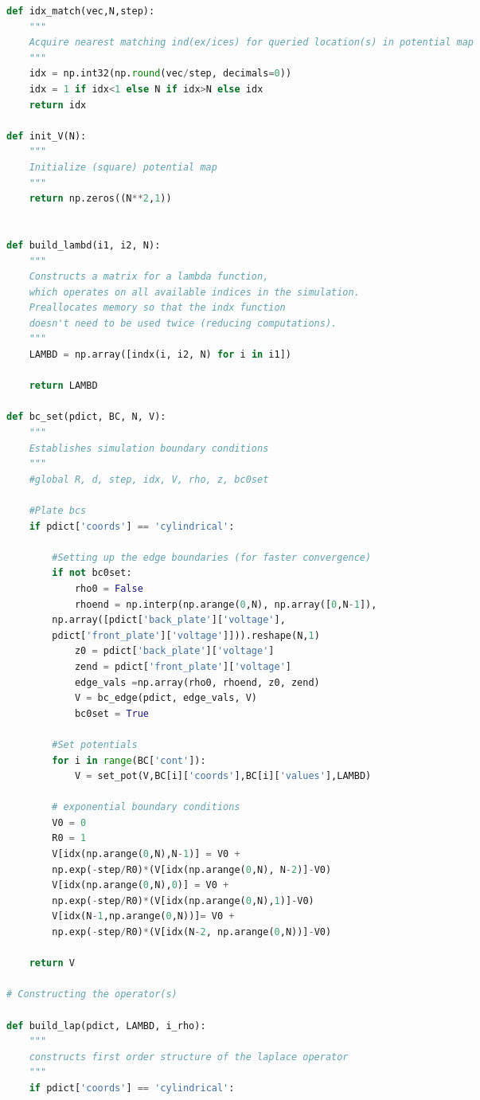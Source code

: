 \begin{spacing}{1.2}
\begin{lstlisting}[frame=single, language=Python]
def idx_match(vec,N,step):
    """
    Acquire nearest matching ind(ex/ices) for queried location(s) in potential map
    """
    idx = np.int32(np.round(vec/step, decimals=0))
    idx = 1 if idx<1 else N if idx>N else idx
    return idx

def init_V(N):
    """
    Initialize (square) potential map
    """
    return np.zeros((N**2,1))
    

def build_lambd(i1, i2, N):
    """
    Constructs a matrix for a lambda function, 
	which operates on all available indices in the simulation.
    Preallocates memory so that the indx function 
	doesn't need to be used twice (reducing computations).
    """
    LAMBD = np.array([indx(i, i2, N) for i in i1])
    
    return LAMBD

def bc_set(pdict, BC, N, V):
    """
    Establishes simulation boundary conditions
    """
    #global R, d, step, idx, V, rho, z, bc0set
    
    #Plate bcs
    if pdict['coords'] == 'cylindrical':
        
        #Setting up the edge boundaries (for faster convergence)  
        if not bc0set:
            rho0 = False
            rhoend = np.interp(np.arange(0,N), np.array([0,N-1]),
		np.array([pdict['back_plate']['voltage'],
		pdict['front_plate']['voltage']])).reshape(N,1)
            z0 = pdict['back_plate']['voltage']
            zend = pdict['front_plate']['voltage']
            edge_vals =np.array(rho0, rhoend, z0, zend)
            V = bc_edge(pdict, edge_vals, V)
            bc0set = True
            
        #Set potentials
        for i in range(BC['cont']):
            V = set_pot(V,BC[i]['coords'],BC[i]['values'],LAMBD)
        
        # exponential boundary conditions
        V0 = 0
        R0 = 1
        V[idx(np.arange(0,N),N-1)] = V0 + 
	    np.exp(-step/R0)*(V[idx(np.arange(0,N), N-2)]-V0)
        V[idx(np.arange(0,N),0)] = V0 + 
	    np.exp(-step/R0)*(V[idx(np.arange(0,N),1)]-V0)
        V[idx(N-1,np.arange(0,N))]= V0 + 
	    np.exp(-step/R0)*(V[idx(N-2, np.arange(0,N))]-V0) 
                 
    return V

# Constructing the operator(s)
    
def build_lap(pdict, LAMBD, i_rho):
    """
    constructs first order structure of the laplace operator
    """
    if pdict['coords'] == 'cylindrical':
        

\end{lstlisting}
\end{spacing}
